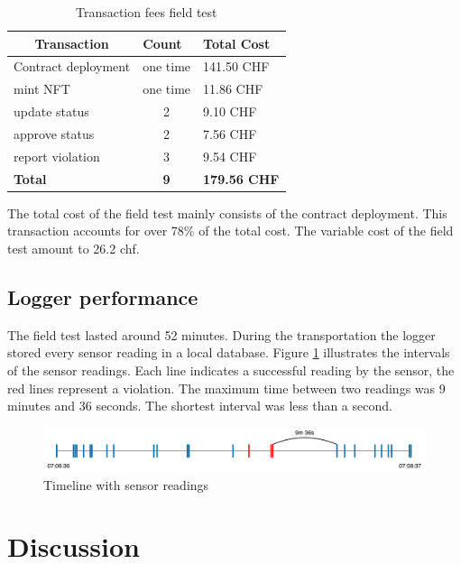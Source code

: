 \begin{table}[h]
\centering
\begin{tabular}{lcl}
\multicolumn{1}{c}{\textbf{Transaction}} & \multicolumn{1}{l}{\textbf{Count}} & \textbf{Total Cost} \\ \hline
Contract deployment                      & one time                           & 141.50 CHF          \\
mint NFT                                 & one time                           & 11.86 CHF           \\
update status                            & 2                                  & 9.10 CHF            \\
approve status                           & 2                                  & 7.56 CHF            \\
report violation                         & 3                                  & 9.54 CHF            \\ \hline
\textbf{Total}                           & \textbf{9}                         & \textbf{179.56 CHF} \\
\hline
\end{tabular}
\caption{Transaction fees field test}
\label{tab:field_test_tx_fees}
\end{table}

The total cost of the field test mainly consists of the contract deployment. This transaction accounts for over 78\% of the total cost. The variable cost of the field test amount to 26.2 \gls{chf}.

\subsection{Logger performance}
The field test lasted around 52 minutes. During the transportation the logger stored every sensor reading in a local database. Figure \ref{fig:field_test_sensor_readings} illustrates the intervals of the sensor readings. Each line indicates a successful reading by the sensor, the red lines represent a violation. The maximum time between two readings was 9 minutes and 36 seconds. The shortest interval was less than a second.

\begin{figure}[h]
    \centering
    \includegraphics[width=\textwidth]{diagrams/sensor_eval.drawio.pdf}
    \caption{Timeline with sensor readings}
    \label{fig:field_test_sensor_readings}
\end{figure}


\section{Discussion}
\label{sec:eval_discussion}